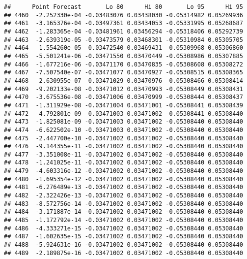 \documentclass[
]{article}
\begin{document}
\begin{verbatim}
##      Point Forecast       Lo 80      Hi 80       Lo 95      Hi 95
## 4460  -2.252330e-04 -0.03483076 0.03438030 -0.05314982 0.05269936
## 4461  -3.165376e-04 -0.03497361 0.03434053 -0.05331995 0.05268687
## 4462  -1.283365e-04 -0.03481961 0.03456294 -0.05318406 0.05292739
## 4463  -2.639319e-05 -0.03473579 0.03468301 -0.05310984 0.05305705
## 4464  -1.554260e-05 -0.03472540 0.03469431 -0.05309968 0.05306860
## 4465  -5.501241e-06 -0.03471550 0.03470449 -0.05308986 0.05307885
## 4466  -1.677216e-06 -0.03471170 0.03470835 -0.05308608 0.05308272
## 4467  -7.507540e-07 -0.03471077 0.03470927 -0.05308515 0.05308365
## 4468  -2.630955e-07 -0.03471029 0.03470976 -0.05308466 0.05308414
## 4469  -9.202133e-08 -0.03471012 0.03470993 -0.05308449 0.05308431
## 4470  -3.675536e-08 -0.03471006 0.03470999 -0.05308444 0.05308437
## 4471  -1.311929e-08 -0.03471004 0.03471001 -0.05308441 0.05308439
## 4472  -4.792801e-09 -0.03471003 0.03471002 -0.05308441 0.05308440
## 4473  -1.825081e-09 -0.03471003 0.03471002 -0.05308440 0.05308440
## 4474  -6.622502e-10 -0.03471003 0.03471002 -0.05308440 0.05308440
## 4475  -2.447700e-10 -0.03471002 0.03471002 -0.05308440 0.05308440
## 4476  -9.144355e-11 -0.03471002 0.03471002 -0.05308440 0.05308440
## 4477  -3.351008e-11 -0.03471002 0.03471002 -0.05308440 0.05308440
## 4478  -1.241025e-11 -0.03471002 0.03471002 -0.05308440 0.05308440
## 4479  -4.603316e-12 -0.03471002 0.03471002 -0.05308440 0.05308440
## 4480  -1.695354e-12 -0.03471002 0.03471002 -0.05308440 0.05308440
## 4481  -6.276489e-13 -0.03471002 0.03471002 -0.05308440 0.05308440
## 4482  -2.322426e-13 -0.03471002 0.03471002 -0.05308440 0.05308440
## 4483  -8.572756e-14 -0.03471002 0.03471002 -0.05308440 0.05308440
## 4484  -3.171887e-14 -0.03471002 0.03471002 -0.05308440 0.05308440
## 4485  -1.172792e-14 -0.03471002 0.03471002 -0.05308440 0.05308440
## 4486  -4.333271e-15 -0.03471002 0.03471002 -0.05308440 0.05308440
## 4487  -1.602635e-15 -0.03471002 0.03471002 -0.05308440 0.05308440
## 4488  -5.924631e-16 -0.03471002 0.03471002 -0.05308440 0.05308440
## 4489  -2.189875e-16 -0.03471002 0.03471002 -0.05308440 0.05308440
\end{verbatim}
\end{document}
